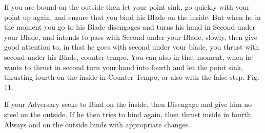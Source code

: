 \newpage


\newpage

\exercise{}

If you are bound on the outside then let your point sink, go quickly with your point up again, and ensure that you bind his Blade on the inside. But when he in the moment you go to his Blade disengages and turns his hand in Second under your Blade, and intends to pass with Second under your Blade, slowly, then give good attention to, in that he goes with second under your blade, you thrust with second under his Blade, counter-tempo. You can also in that moment, when he wants to thrust in second turn your hand into fourth and let the point sink, thrusting fourth on the inside in Counter Tempo, or also with the false step. Fig. 11.


\exercise{}


If your Adversary seeks to Bind on the inside, then Disengage and give him no steel on the outside. If he then tries to bind again, then thrust inside in fourth; Always and on the outside binds with appropriate changes.

\exercise{}


